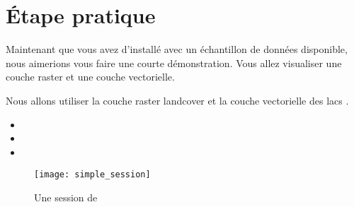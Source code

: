 \section{Étape pratique}\label{samplesession}

Maintenant que vous avez \qg d'installé avec un échantillon de données disponible, nous aimerions vous faire une courte démonstration. Vous allez visualiser une couche raster et une couche vectorielle.

Nous allons utiliser la couche raster landcover  
et la couche vectorielle des lacs .


\begin{itemize}[label=--]
\item {}
\item {}
\item {}
\end{itemize} 

\begin{figure}[ht]
   \begin{center} 
   \texttt{[image: simple\_session]}
   \caption{Une session de \qg  \nixcaption}\label{fig:simple_session}
\end{center}
\end{figure}

